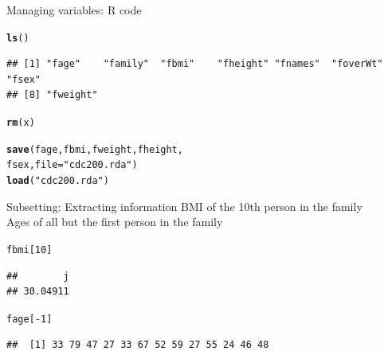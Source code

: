 \documentclass{beamer}\usepackage[]{graphicx}\usepackage[]{color}
\makeatletter
\newcommand{\hlnum}[1]{\textcolor[rgb]{0.686,0.059,0.569}{#1}}%
\newcommand{\hlstr}[1]{\textcolor[rgb]{0.192,0.494,0.8}{#1}}%
\newcommand{\hlopt}[1]{\textcolor[rgb]{0,0,0}{#1}}%
\newcommand{\hlstd}[1]{\textcolor[rgb]{0.345,0.345,0.345}{#1}}%
\newcommand{\hlkwc}[1]{\textcolor[rgb]{0.333,0.667,0.333}{#1}}%
\newcommand{\hlkwd}[1]{\textcolor[rgb]{0.737,0.353,0.396}{\textbf{#1}}}%
\newenvironment{kframe}{%
 \def\at@end@of@kframe{}%
 \ifinner\ifhmode%
  \def\at@end@of@kframe{\end{minipage}}%
  \begin{minipage}{\columnwidth}%
 \fi\fi%
 \def\FrameCommand##1{\hskip\@totalleftmargin \hskip-\fboxsep
 \colorbox{shadecolor}{##1}\hskip-\fboxsep
     \hskip-\linewidth \hskip-\@totalleftmargin \hskip\columnwidth}%
 \MakeFramed {\advance\hsize-\width
   \@totalleftmargin\z@ \linewidth\hsize
   \@setminipage}}%
 {\par\unskip\endMakeFramed%
 \at@end@of@kframe}
\newenvironment{knitrout}{}{} %
\renewenvironment{knitrout}{\begin{singlespace}}{\end{singlespace}}
\theoremstyle{mystyle}
\makeatother
\begin{document}
\begin{frame}[fragile]{Managing variables: R code}
\begin{knitrout}
\color{fgcolor}\begin{kframe}
\begin{alltt}
\hlkwd{ls}\hlstd{()}
\end{alltt}
\begin{verbatim}
## [1] "fage"    "family"  "fbmi"    "fheight" "fnames"  "foverWt" "fsex"   
## [8] "fweight"
\end{verbatim}
\begin{alltt}
\hlkwd{rm}\hlstd{(x)}
\end{alltt}


{\ttfamily\noindent\color{warningcolor}{\#\# Warning in rm(x): object 'x' not found}}\begin{alltt}
\hlkwd{save}\hlstd{(fage, fbmi, fweight, fheight,}
     \hlstd{fsex,} \hlkwc{file}\hlstd{=}\hlstr{"cdc200.rda"}\hlstd{)}
\hlkwd{load}\hlstd{(}\hlstr{"cdc200.rda"}\hlstd{)}
\end{alltt}
\end{kframe}
\end{knitrout}
\end{frame}


\begin{frame}[fragile]{Subsetting: Extracting information}
BMI of the 10th person in the family\\
Ages of all but the first person in the family
\begin{knitrout}
\color{fgcolor}\begin{kframe}
\begin{alltt}
\hlstd{fbmi[}\hlnum{10}\hlstd{]}
\end{alltt}
\begin{verbatim}
##        j 
## 30.04911
\end{verbatim}
\begin{alltt}
\hlstd{fage[}\hlopt{-}\hlnum{1}\hlstd{]}
\end{alltt}
\begin{verbatim}
##  [1] 33 79 47 27 33 67 52 59 27 55 24 46 48
\end{verbatim}
\end{kframe}
\end{knitrout}
\end{frame}
\end{document}
